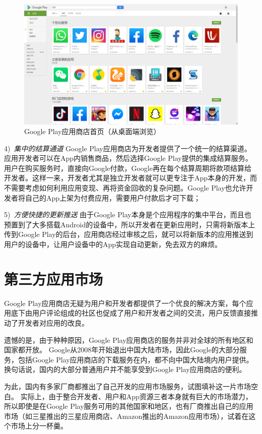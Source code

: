 \begin{figure}[htbp]
	\centering
	\includegraphics[width=\textwidth]{./Figures/edwin-google-play.jpg}
	\caption{Google Play应用商店首页（从桌面端浏览）}
	\label{fig:Google-Play-Main}
\end{figure}

4)\ \emph{集中的结算通道} \quad
Google Play应用商店为开发者提供了一个统一的结算渠道。应用开发者可以在App内销售商品，然后选择Google Play提供的集成结算服务。用户在购买服务时，直接向Google付款，Google再在每个结算周期将款项结算给开发者。这样一来，开发者尤其是独立开发者就可以更专注于App本身的开发，而不需要考虑如何利用应用变现、再将资金回收的复杂问题。Google Play也允许开发者将自己的App上架为付费应用，需要用户付款后才可下载；

5)\ \emph{方便快捷的更新推送} \quad
由于Google Play本身是个应用程序的集中平台，而且也预置到了大多搭载Android的设备中，所以开发者在更新应用时，只需将新版本上传到Google Play的后台，应用商店经过审核之后，就可以将新版本的应用推送到用户的设备中，让用户设备中的App实现自动更新，免去双方的麻烦。


\section{第三方应用市场}

Google Play应用商店无疑为用户和开发者都提供了一个优良的解决方案，每个应用底下由用户评论组成的社区也促成了用户和开发者之间的交流，用户反馈直接推动了开发者对应用的改良。

遗憾的是，由于种种原因，Google Play应用商店的服务并非对全球的所有地区和国家都开放。
Google从2008年开始退出中国大陆市场，因此Google的大部分服务，包括Google Play应用商店的下载服务在内，都不向中国大陆境内用户提供。
换句话说，国内的大部分普通用户并不能享受到Google Play应用商店的便利。

为此，国内有多家厂商都推出了自己开发的应用市场服务，试图填补这一片市场空白。
实际上，由于整合开发者、用户和App资源三者本身就有巨大的市场潜力，所以即使是在Google Play服务可用的其他国家和地区，也有厂商推出自己的应用市场（如三星推出的三星应用商店、Amazon推出的Amazon应用市场），试着在这个市场上分一杯羹。

